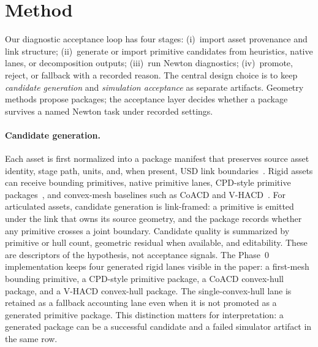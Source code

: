 \section{Method}
\label{sec:method}

Our diagnostic acceptance loop has four stages: (i)~import asset provenance and link structure; (ii)~generate or import primitive candidates from heuristics, native lanes, or decomposition outputs; (iii)~run Newton diagnostics; (iv)~promote, reject, or fallback with a recorded reason.
The central design choice is to keep \emph{candidate generation} and \emph{simulation acceptance} as separate artifacts.
Geometry methods propose packages; the acceptance layer decides whether a package survives a named Newton task under recorded settings.

\paragraph{Candidate generation.}
Each asset is first normalized into a package manifest that preserves source asset identity, stage path, units, and, when present, USD link boundaries~\cite{openusd2026}.
Rigid assets can receive bounding primitives, native primitive lanes, CPD-style primitive packages~\cite{cpd2026}, and convex-mesh baselines such as CoACD and V-HACD~\cite{coacd2022,vhacd}.
For articulated assets, candidate generation is link-framed: a primitive is emitted under the link that owns its source geometry, and the package records whether any primitive crosses a joint boundary.
Candidate quality is summarized by primitive or hull count, geometric residual when available, and editability.
These are descriptors of the hypothesis, not acceptance signals.
The Phase~0 implementation keeps four generated rigid lanes visible in the paper: a first-mesh
bounding primitive, a CPD-style primitive package, a CoACD convex-hull package, and a V-HACD
convex-hull package.
The single-convex-hull lane is retained as a fallback accounting lane even when it is not promoted
as a generated primitive package.
This distinction matters for interpretation: a generated package can be a successful candidate and
a failed simulator artifact in the same row.

